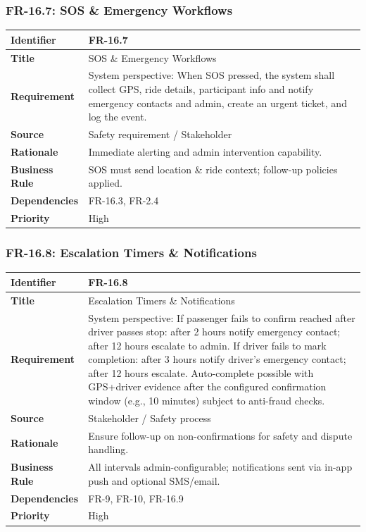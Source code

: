 \subsubsection{FR-16.7: SOS \& Emergency Workflows}

\begin{longtable}{|p{3cm}|p{12cm}|}
\hline
\rowcolor{lightgray!30}
\textbf{Identifier} & FR-16.7 \\
\hline
\textbf{Title} & SOS \& Emergency Workflows \\
\hline
\textbf{Requirement} & System perspective: When SOS pressed, the system shall collect GPS, ride details, participant info and notify emergency contacts and admin, create an urgent ticket, and log the event. \\
\hline
\textbf{Source} & Safety requirement / Stakeholder \\
\hline
\textbf{Rationale} & Immediate alerting and admin intervention capability. \\
\hline
\textbf{Business Rule} & SOS must send location \& ride context; follow-up policies applied. \\
\hline
\textbf{Dependencies} & FR-16.3, FR-2.4 \\
\hline
\textbf{Priority} & High \\
\hline
\end{longtable}

\subsubsection{FR-16.8: Escalation Timers \& Notifications}

\begin{longtable}{|p{3cm}|p{12cm}|}
\hline
\rowcolor{lightgray!30}
\textbf{Identifier} & FR-16.8 \\
\hline
\textbf{Title} & Escalation Timers \& Notifications \\
\hline
\textbf{Requirement} & System perspective: If passenger fails to confirm reached after driver passes stop: after 2 hours notify emergency contact; after 12 hours escalate to admin. If driver fails to mark completion: after 3 hours notify driver’s emergency contact; after 12 hours escalate. Auto-complete possible with GPS+driver evidence after the configured confirmation window (e.g., 10 minutes) subject to anti-fraud checks. \\
\hline
\textbf{Source} & Stakeholder / Safety process \\
\hline
\textbf{Rationale} & Ensure follow-up on non-confirmations for safety and dispute handling. \\
\hline
\textbf{Business Rule} & All intervals admin-configurable; notifications sent via in-app push and optional SMS/email. \\
\hline
\textbf{Dependencies} & FR-9, FR-10, FR-16.9 \\
\hline
\textbf{Priority} & High \\
\hline
\end{longtable}

